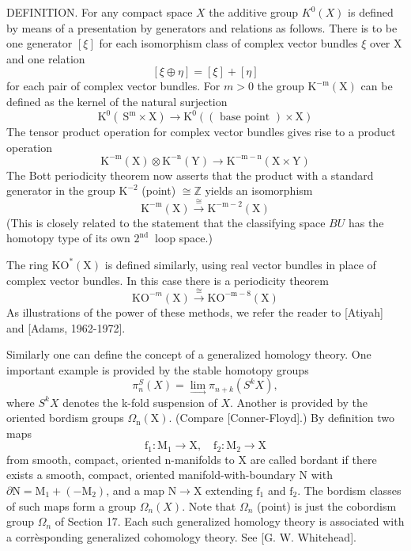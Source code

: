 \documentclass[10pt]{article}
\begin{document}
DEFINITION. For any compact space $X$ the additive group $K^{0}(X)$ is defined by means of a presentation by generators and relations as follows. There is to be one generator $[\xi]$ for each isomorphism class of complex vector bundles $\xi$ over $\mathrm{X}$ and one relation
$$
[\xi \oplus \eta]=[\xi]+[\eta]
$$
for each pair of complex vector bundles. For $m>0$ the group $\mathrm{K}^{-\mathrm{m}}(\mathrm{X})$ can be defined as the kernel of the natural surjection
$$
\mathrm{K}^{0}\left(\mathrm{~S}^{\mathrm{m}} \times \mathrm{X}\right) \rightarrow \mathrm{K}^{0}((\text { base point }) \times \mathrm{X})
$$
The tensor product operation for complex vector bundles gives rise to a product operation
$$
\mathrm{K}^{-\mathrm{m}}(\mathrm{X}) \otimes \mathrm{K}^{-\mathrm{n}}(\mathrm{Y}) \rightarrow \mathrm{K}^{-\mathrm{m}-\mathrm{n}}(\mathrm{X} \times \mathrm{Y})
$$
The Bott periodicity theorem now asserts that the product with a standard generator in the group $\mathrm{K}^{-2}$ (point) $\cong \mathbb{Z}$ yields an isomorphism
$$
\mathrm{K}^{-\mathrm{m}}(\mathrm{X}) \stackrel{\cong}{\longrightarrow} \mathrm{K}^{-\mathrm{m}-2}(\mathrm{X})
$$
(This is closely related to the statement that the classifying space $B U$ has the homotopy type of its own $2^{\text {nd }}$ loop space.)

The ring $\mathrm{KO}^{*}(\mathrm{X})$ is defined similarly, using real vector bundles in place of complex vector bundles. In this case there is a periodicity theorem
$$
\mathrm{KO}^{-m}(\mathrm{X}) \stackrel{\cong}{\longrightarrow} \mathrm{KO}^{-\mathrm{m}-8}(\mathrm{X})
$$
As illustrations of the power of these methods, we refer the reader to [Atiyah] and [Adams, 1962-1972].

Similarly one can define the concept of a generalized homology theory. One important example is provided by the stable homotopy groups
$$
\pi_{n}^{S}(X)=\lim _{\rightarrow} \pi_{n+k}\left(S^{k} X\right),
$$
where $S^{k} X$ denotes the k-fold suspension of $X$. Another is provided by the oriented bordism groups $\Omega_{\mathrm{n}}(\mathrm{X})$. (Compare [Conner-Floyd].) By definition two maps
$$
\mathrm{f}_{1}: \mathrm{M}_{1} \rightarrow \mathrm{X}, \quad \mathrm{f}_{2}: \mathrm{M}_{2} \rightarrow \mathrm{X}
$$
from smooth, compact, oriented $\mathrm{n}$-manifolds to $\mathrm{X}$ are called bordant if there exists a smooth, compact, oriented manifold-with-boundary $\mathrm{N}$ with $\partial \mathrm{N}=\mathrm{M}_{1}+\left(-\mathrm{M}_{2}\right)$, and a map $\mathrm{N} \rightarrow \mathrm{X}$ extending $\mathrm{f}_{1}$ and $\mathrm{f}_{2}$. The bordism classes of such maps form a group $\Omega_{n}(X)$. Note that $\Omega_{n}$ (point) is just the cobordism group $\Omega_{n}$ of Section 17. Each such generalized homology theory is associated with a corrèsponding generalized cohomology theory. See [G. W. Whitehead].
\end{document}
